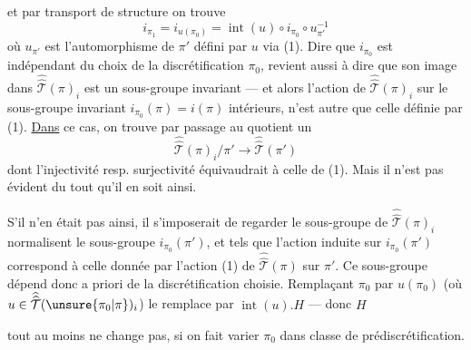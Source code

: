 
et par transport de structure on trouve
\[
i_{\pi_1}=i_{u(\pi_0)}=\operatorname{int}(u)\circ i_{\pi_0}\circ u_{\pi'}^{-1}
\]
où $u_{\pi'}$ est l'automorphisme de $\pi'$ défini par $u$ via (1). Dire que $i_{\pi_0}$ est indépendant du choix de la discrétification $\pi_0$, revient aussi à dire que son image dans $\widehat{\widehat{\mathcal T}}(\pi)_i$ est un sous-groupe invariant --- et alors l'action de $\widehat{\widehat{\mathcal T}}(\pi)_i$ sur \deleted{\unsure{$\pi$}} le sous-groupe invariant $i_{\pi_0}(\pi)=i(\pi)$    intérieurs, n'est autre que celle définie par (1). \uline{Dans} ce cas, on trouve par passage au quotient un 
\[
\tag{6}
\widehat{\widehat{\mathcal T}}(\pi)_i/\pi'\longrightarrow\widehat{\widehat{\mathcal T}}(\pi')
\]
dont l'injectivité resp. surjectivité équivaudrait à celle de (1). Mais il n'est pas évident du tout qu'il en soit  ainsi.

S'il n'en était pas ainsi, il  s'imposerait de regarder le sous-groupe de $\widehat{\widehat{\mathcal T}}(\pi)_i$   normalisent le sous-groupe  $i_{\pi_0}(\pi')$, et tels que l'action induite sur $i_{\pi_0}(\pi')$ correspond à celle donnée par l'action (1) de $\widehat{\widehat{\mathcal T}}(\pi)$ sur $\pi'$. Ce sous-groupe  dépend donc a priori de la discrétification choisie. Remplaçant $\pi_0$ par $u(\pi_0)$ (où  $u\in\widehat{\widehat{\mathcal T}}(\unsure{\pi_0|\pi})_i$) le remplace par $\operatorname{int}(u).H$ --- donc $H$


tout au moins ne change pas, si on fait varier $\pi_0$ dans  classe de prédiscrétification.

